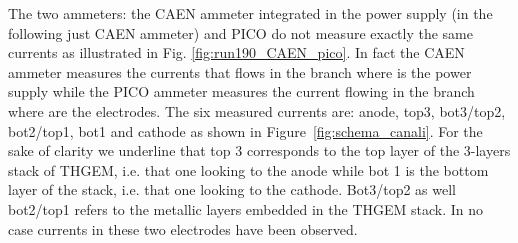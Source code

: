 \documentclass[a4paper, 11 pt]{report}
\begin{document}
The two ammeters: the CAEN ammeter integrated in the power supply (in the following just CAEN 
ammeter) and PICO do not measure exactly the same currents as illustrated in Fig. 
\ref{fig:run190_CAEN_pico}. In fact the 
CAEN ammeter measures the currents that flows in the branch where is the power supply while the 
PICO ammeter measures the current flowing in the branch where are the electrodes. The six measured
currents are: anode, top3, bot3/top2, bot2/top1, bot1 and cathode as shown in 
Figure~\ref{fig:schema_canali}. For the sake of clarity we underline that top 3 corresponds to the 
top layer of the 3-layers stack of THGEM, i.e. that one looking to the anode while bot 1 is the 
bottom layer of the stack, i.e. that one looking to the cathode. Bot3/top2 as well bot2/top1 
refers to the metallic layers embedded in the THGEM stack. In no case currents in these two 
electrodes have been observed.
\end{document}
